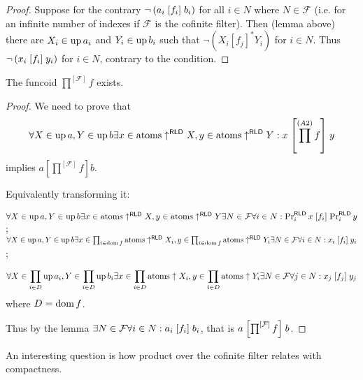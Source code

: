 \begin{proof}
  Suppose for the contrary $\neg \left( a_i \mathrel{\left[f_i\right]} b_i \right)$ for
  all $i \in N$ where $N \in \mathcal{F}$ (i.e. for an infinite number of
  indexes if $\mathcal{F}$ is the cofinite filter). Then (lemma above) there
  are $X_i \in \operatorname{up} a_i$ and $Y_i \in \operatorname{up} b_i$ such that $\neg
  \left( X_i \mathrel{[f_j]^{\ast}} Y_i \right)$ for $i \in N$. Thus $\neg
  \left( x_i \mathrel{\left[f_i\right]} y_i \right)$ for $i \in N$, contrary to the
  condition.
\end{proof}

\begin{prop}
  The funcoid $\prod^{[\mathcal{F}]} f$ exists.
\end{prop}

\begin{proof}
  We need to prove that
  \[ \forall X \in \operatorname{up} a, Y \in \operatorname{up} b \exists x \in \operatorname{atoms}
     \uparrow^{\mathsf{RLD}} X, y \in \operatorname{atoms}
     \uparrow^{\mathsf{RLD}} Y : x \mathrel{\left[ \prod^{(A 2)} f
     \right]} y \]
  implies $a \mathrel{\left[ \prod^{[\mathcal{F}]} f \right]} b$.
  
  Equivalently transforming it: 
  
  $\forall X \in \operatorname{up} a, Y \in \operatorname{up} b \exists x \in \operatorname{atoms}
  \uparrow^{\mathsf{RLD}} X, y \in \operatorname{atoms}
  \uparrow^{\mathsf{RLD}} Y \\  
  \exists N \in \mathcal{F} \forall i \in N : \Pr^{\mathsf{RLD}}_i x
  \mathrel{\left[f_i\right]} \Pr^{\mathsf{RLD}}_i y$; \\
  $\forall X \in \operatorname{up} a, Y \in \operatorname{up} b \exists x \in \prod_{i \in
  \operatorname{dom} f} \operatorname{atoms} \uparrow^{\mathsf{RLD}} X_i, y \in
  \prod_{i \in \operatorname{dom} f} \operatorname{atoms} \uparrow^{\mathsf{RLD}} Y_i \\  
  \exists N \in \mathcal{F} \forall i \in N : x_i \mathrel{\left[f_i\right]} y_i$;

  \[ \forall X \in \prod_{i \in D} \operatorname{up} a_i, Y \in \prod_{i \in D}
     \operatorname{up} b_i \exists x \in \prod_{i \in D} \mathrm{atoms} \uparrow X_i,
     y \in \prod_{i \in D} \mathrm{atoms} \uparrow Y_i \exists N \in
     \mathcal{F} \forall j \in N : x_j \mathrel{[f_j]} y_j \]
  where $D = \operatorname{dom} f$.
  
  Thus by the lemma $\exists N \in \mathcal{F} \forall i \in N : a_i
  \mathrel{\left[f_i\right]} b_i$, that is $a \mathrel{\left[\prod^{[\mathcal{F}]} f\right]} b$.
\end{proof}

An interesting question is how product over the cofinite filter relates with compactness.